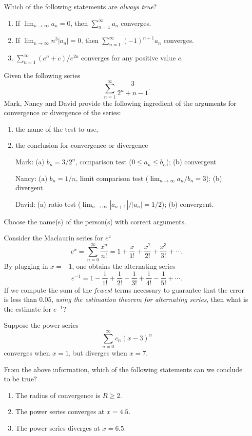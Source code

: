 \begin{problem}
Which of the following statements are \emph{always true}?
\begin{enumerate}[label=(\MakeUppercase{\roman*})]
\item If $\lim_{n\to\infty} a_n=0$, then $\sum_{n=1}^\infty a_n$
  converges.
\item If $\lim_{n\to\infty} n^3|a_n|=0$, then
  $\sum_{n=1}^\infty(-1)^{n+1}a_n$ converges.
\item $\sum_{n=1}^\infty (e^n+c)/e^{2n}$ converges for any positive value
  $c$.
\end{enumerate}
\end{problem}
\begin{problem}
Given the following series
\[
\sum_{n=1}^\infty\frac{3}{2^n+n-1}.
\]
Mark, Nancy and David provide the following ingredient of the arguments for
convergence or divergence of the series:
\begin{enumerate}[label=(\alph*)]
\item the name of the test to use,
\item the conclusion for convergence or divergence
\end{enumerate}
\begin{itemize}
\item[Mark:] (a) $b_n=3/2^n$, comparison test ($0\leq a_n\leq b_n$); (b)
  convergent
\item[Nancy:] (a) $b_n=1/n$, limit comparison test ($\lim_{n\to\infty}
  a_n/b_n=3$); (b) divergent
\item[David:] (a) ratio test ($\lim_{n\to\infty}|a_{n+1}|/|a_n|=1/2$); (b)
  convergent.
\end{itemize}
Choose the name(s) of the person(s) with correct arguments.
\end{problem}
\begin{problem}
Consider the Maclaurin series for $e^x$
\[
e^x=\sum_{n=0}^\infty\frac{x^n}{n!}=1+\frac{x}{1!}+\frac{x^2}{2!}+\frac{x^3}{3!}+\dotsb.
\]
By plugging in $x=-1$, one obtains the alternating series
\[
e^{-1}=1-\frac{1}{1!}+\frac{1}{2!}-\frac{1}{3!}+\frac{1}{4!}-\frac{1}{5!}+\dotsb.
\]
If we compute the sum of the \emph{fewest} terms necessary to guarantee
that the error is less than $0.05$, \emph{using the estimation theorem for
  alternating series}, then what is the estimate for $e^{-1}$?
\end{problem}
\begin{problem}
Suppose the power series
\[
\sum_{n=0}^\infty c_n(x-3)^n
\]
converges when $x=1$, but diverges when $x=7$.

From the above information, which of the following statements can we
conclude to be true?
\begin{enumerate}[label=(\MakeUppercase{\roman*})]
\item The radius of convergence is $R\geq 2$.
\item The power series converges at $x=4.5$.
\item The power series diverges at $x=6.5$.
\end{enumerate}
\end{problem}
